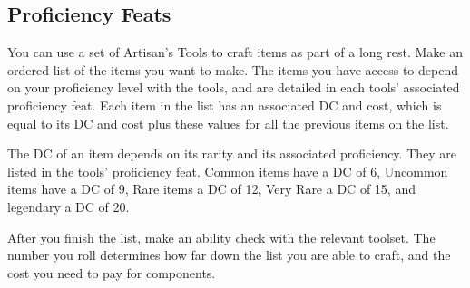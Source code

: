 \subsection*{Proficiency Feats}
    You can use a set of Artisan's Tools to craft items as part of a long rest.
    Make an ordered list of the items you want to make.
    The items you have access to depend on your proficiency level with the tools, and are detailed in each tools' associated proficiency feat.
    Each item in the list has an associated DC and cost, which is equal to its DC and cost plus these values for all the previous items on the list.

    The DC of an item depends on its rarity and its associated proficiency.
    They are listed in the tools' proficiency feat.
    Common items have a DC of 6, Uncommon items have a DC of 9, Rare items a DC of 12, Very Rare a DC of 15, and legendary a DC of 20.

    After you finish the list, make an ability check with the relevant toolset.
    The number you roll determines how far down the list you are able to craft, and the cost you need to pay for components.

